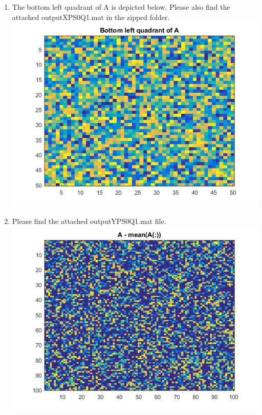 \documentclass{article}
\begin{document}
\begin{enumerate}
\begin{enumerate}
				\item The bottom left quadrant of A is depicted below. Please also find the
				attached outputXPS0Q1.mat in the zipped folder. \\
				\includegraphics[width=\linewidth]{plots/1-A-4/c.png}
				
				\pagebreak
				\item Please find the attached outputYPS0Q1.mat file.\\
				\includegraphics[width=\linewidth]{plots/1-A-4/d.png}
					

\end{enumerate}
\end{enumerate}
\end{document}
